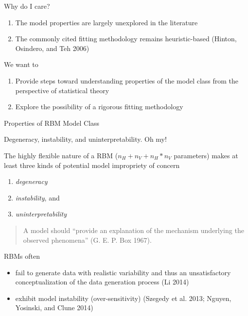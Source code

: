 \documentclass[ignorenonframetext,]{beamer}
\providecommand{\tightlist}{%
  \setlength{\itemsep}{0pt}\setlength{\parskip}{0pt}}
\theoremstyle{definition}
\newcommand{\nv}{{n_{\scriptscriptstyle V}}}
\newcommand{\nh}{{n_{\scriptscriptstyle H}}}
\begin{document}
\begin{frame}{Why do I care?}
\protect\hypertarget{why-do-i-care}{}

\begin{enumerate}
\tightlist
\item
  The model properties are largely unexplored in the literature
\item
  The commonly cited fitting methodology remains heuristic-based
  (Hinton, Osindero, and Teh 2006)
\end{enumerate}

We want to

\begin{enumerate}
\tightlist
\item
  Provide steps toward understanding properties of the model class from
  the perspective of statistical theory
\item
  Explore the possibility of a rigorous fitting methodology
\end{enumerate}

\end{frame}

\begin{frame}{}
\protect\hypertarget{section}{}

\begin{center}
\Huge{Properties of RBM Model Class}
\end{center}

\end{frame}

\begin{frame}{Degeneracy, instability, and uninterpretability. Oh my!}
\protect\hypertarget{degeneracy-instability-and-uninterpretability.-oh-my}{}

The highly flexible nature of a RBM (\(\nh + \nv + \nh*\nv\) parameters)
makes at least three kinds of potential model impropriety of concern

\begin{enumerate}
\tightlist
\item
  \emph{degeneracy}
\item
  \emph{instability}, and
\item
  \emph{uninterpretability}
\end{enumerate}

\begin{quote}
A model should ``provide an explanation of the mechanism underlying the
observed phenomena'' (G. E. P. Box 1967).
\end{quote}

RBMs often

\begin{itemize}
\tightlist
\item
  fail to generate data with realistic variability and thus an
  unsatisfactory conceptualization of the data generation process (Li
  2014)
\item
  exhibit model instability (over-sensitivity) (Szegedy et al. 2013;
  Nguyen, Yosinski, and Clune 2014)
\end{itemize}

\end{frame}
\end{document}
